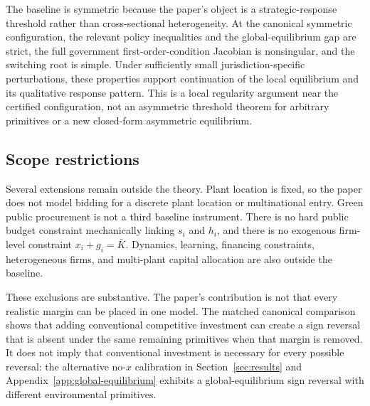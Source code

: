 The baseline is symmetric because the paper's object is a strategic-response threshold rather than cross-sectional heterogeneity. At the canonical symmetric configuration, the relevant policy inequalities and the global-equilibrium gap are strict, the full government first-order-condition Jacobian is nonsingular, and the switching root is simple. Under sufficiently small jurisdiction-specific perturbations, these properties support continuation of the local equilibrium and its qualitative response pattern. This is a local regularity argument near the certified configuration, not an asymmetric threshold theorem for arbitrary primitives or a new closed-form asymmetric equilibrium.

\subsection{Scope restrictions}

Several extensions remain outside the theory. Plant location is fixed, so the paper does not model bidding for a discrete plant location or multinational entry. Green public procurement is not a third baseline instrument. There is no hard public budget constraint mechanically linking $s_i$ and $h_i$, and there is no exogenous firm-level constraint $x_i+g_i=\bar K$. Dynamics, learning, financing constraints, heterogeneous firms, and multi-plant capital allocation are also outside the baseline.

These exclusions are substantive. The paper's contribution is not that every realistic margin can be placed in one model. The matched canonical comparison shows that adding conventional competitive investment can create a sign reversal that is absent under the same remaining primitives when that margin is removed. It does not imply that conventional investment is necessary for every possible reversal: the alternative no-$x$ calibration in Section~\ref{sec:results} and Appendix~\ref{app:global-equilibrium} exhibits a global-equilibrium sign reversal with different environmental primitives.